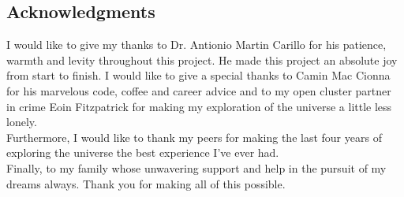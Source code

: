 \documentclass[twocolumn]{aastex631}
\begin{document}
\begin{acknowledgments}
    \section*{Acknowledgments}
I would like to give my thanks to Dr. Antionio Martin Carillo for his patience, warmth and levity throughout this project. He made this project an absolute joy from start to finish. I would like to give a special thanks to Camin Mac Cionna for his marvelous code, coffee and career advice and to my open cluster partner in crime Eoin Fitzpatrick for making my exploration of the universe a little less lonely. \\ 
Furthermore, I would like to thank my peers for making the last four years of exploring the universe the best experience I've ever had.  \\ Finally, to my family whose unwavering support and help in the pursuit of my dreams always. Thank you for making all of this possible. 
\end{acknowledgments}

\appendix
\end{document}
